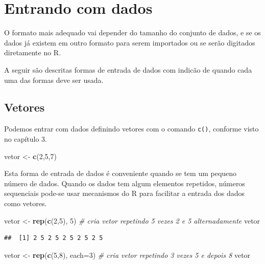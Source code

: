 \documentclass[
]{book}
\newenvironment{Shaded}{\begin{snugshade}}{\end{snugshade}}
\newcommand{\CommentTok}[1]{\textcolor[rgb]{0.56,0.35,0.01}{\textit{#1}}}
\newcommand{\DataTypeTok}[1]{\textcolor[rgb]{0.13,0.29,0.53}{#1}}
\newcommand{\DecValTok}[1]{\textcolor[rgb]{0.00,0.00,0.81}{#1}}
\newcommand{\KeywordTok}[1]{\textcolor[rgb]{0.13,0.29,0.53}{\textbf{#1}}}
\newcommand{\NormalTok}[1]{#1}
\newcommand{\StringTok}[1]{\textcolor[rgb]{0.31,0.60,0.02}{#1}}
\begin{document}
\hypertarget{entrando-com-dados}{%
\section{Entrando com dados}\label{entrando-com-dados}}

O formato mais adequado vai depender do tamanho do conjunto de dados, e se os dados já existem em outro formato para serem importados ou se serão digitados diretamente no R.

A seguir são descritas formas de entrada de dados com indicão de quando cada uma das formas deve ser usada.

\hypertarget{vetores}{%
\subsection{Vetores}\label{vetores}}

Podemos entrar com dados definindo vetores com o comando \texttt{c()}, conforme visto no capítulo 3.

\begin{Shaded}
\begin{Highlighting}[]
\NormalTok{vetor <-}\StringTok{ }\KeywordTok{c}\NormalTok{(}\DecValTok{2}\NormalTok{,}\DecValTok{5}\NormalTok{,}\DecValTok{7}\NormalTok{)}
\end{Highlighting}
\end{Shaded}

Esta forma de entrada de dados é conveniente quando se tem um pequeno número de dados. Quando os dados tem algum elementos repetidos, números sequenciais pode-se usar mecanismos do R para facilitar a entrada dos dados como vetores.

\begin{Shaded}
\begin{Highlighting}[]
\NormalTok{vetor <-}\StringTok{ }\KeywordTok{rep}\NormalTok{(}\KeywordTok{c}\NormalTok{(}\DecValTok{2}\NormalTok{,}\DecValTok{5}\NormalTok{), }\DecValTok{5}\NormalTok{)  }\CommentTok{# cria vetor repetindo 5 vezes 2 e 5 alternadamente}
\NormalTok{vetor}
\end{Highlighting}
\end{Shaded}

\begin{verbatim}
##  [1] 2 5 2 5 2 5 2 5 2 5
\end{verbatim}

\begin{Shaded}
\begin{Highlighting}[]
\NormalTok{vetor <-}\StringTok{ }\KeywordTok{rep}\NormalTok{(}\KeywordTok{c}\NormalTok{(}\DecValTok{5}\NormalTok{,}\DecValTok{8}\NormalTok{), }\DataTypeTok{each=}\DecValTok{3}\NormalTok{)  }\CommentTok{# cria vetor repetindo 3 vezes 5 e depois 8}
\NormalTok{vetor}
\end{Highlighting}
\end{Shaded}
\end{document}
